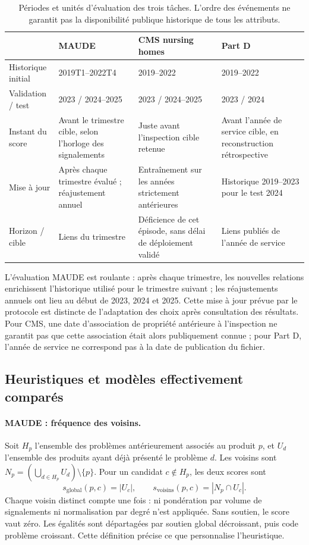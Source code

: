 \begin{table}[!htbp]
\centering\footnotesize
\caption{Périodes et unités d'évaluation des trois tâches. L'ordre des événements ne garantit pas la disponibilité publique historique de tous les attributs.}
\label{tab:time}
\begin{tabularx}{\linewidth}{@{}lXXX@{}}
\toprule
 & MAUDE & CMS nursing homes & Part D\\
\midrule
Historique initial & 2019T1--2022T4 & 2019--2022 & 2019--2022\\
Validation / test & 2023 / 2024--2025 & 2023 / 2024--2025 & 2023 / 2024\\
Instant du score & Avant le trimestre cible, selon l'horloge des signalements & Juste avant l'inspection cible retenue & Avant l'année de service cible, en reconstruction rétrospective\\
Mise à jour & Après chaque trimestre évalué ; réajustement annuel & Entraînement sur les années strictement antérieures & Historique 2019--2023 pour le test 2024\\
Horizon / cible & Liens du trimestre & Déficience de cet épisode, sans délai de déploiement validé & Liens publiés de l'année de service\\
\bottomrule
\end{tabularx}
\end{table}

L'évaluation MAUDE est roulante : après chaque trimestre, les nouvelles relations enrichissent l'historique utilisé pour le trimestre suivant ; les réajustements annuels ont lieu au début de 2023, 2024 et 2025. Cette mise à jour prévue par le protocole est distincte de l'adaptation des choix après consultation des résultats. Pour CMS, une date d'association de propriété antérieure à l'inspection ne garantit pas que cette association était alors publiquement connue ; pour Part D, l'année de service ne correspond pas à la date de publication du fichier\cite{hgbcode,hgbresults}.

\subsection{Heuristiques et modèles effectivement comparés}
\label{sec:models}

\paragraph{MAUDE : fréquence des voisins.} Soit $H_p$ l'ensemble des problèmes antérieurement associés au produit $p$, et $U_d$ l'ensemble des produits ayant déjà présenté le problème $d$. Les voisins sont $N_p=(\bigcup_{d\in H_p} U_d)\setminus\{p\}$. Pour un candidat $c\notin H_p$, les deux scores sont
\begin{equation}
 s_{\mathrm{global}}(p,c)=|U_c|,\qquad
 s_{\mathrm{voisins}}(p,c)=|N_p\cap U_c|.
\end{equation}
Chaque voisin distinct compte une fois : ni pondération par volume de signalements ni normalisation par degré n'est appliquée. Sans soutien, le score vaut zéro. Les égalités sont départagées par soutien global décroissant, puis code problème croissant\cite{hgbcode}. Cette définition précise ce que personnalise l'heuristique.

